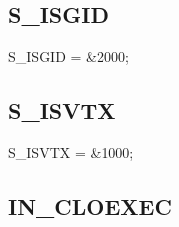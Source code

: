 \documentclass{report}
\newif\ifpdf
\begin{document}
\subsection*{S{\_}ISGID}
\fi
\label{ok_octal_notation-S_ISGID}
\begin{list}{}{
\setlength{\itemindent}{0cm}
\setlength{\listparindent}{0cm}
\setlength{\leftmargin}{\evensidemargin}
\addtolength{\leftmargin}{\tmplength}
\settowidth{\labelsep}{X}
\addtolength{\leftmargin}{\labelsep}
\setlength{\labelwidth}{\tmplength}
}
\item[\textbf{Declaration}\hfill]
\ifpdf
\begin{flushleft}
\fi
\begin{ttfamily}
S{\_}ISGID = {\&}2000;\end{ttfamily}

\ifpdf
\end{flushleft}
\fi

\end{list}
\ifpdf
\subsection*{\large{\textbf{S{\_}ISVTX}}\normalsize\hspace{1ex}\hrulefill}
\else
\subsection*{S{\_}ISVTX}
\fi
\label{ok_octal_notation-S_ISVTX}
\begin{list}{}{
\setlength{\itemindent}{0cm}
\setlength{\listparindent}{0cm}
\setlength{\leftmargin}{\evensidemargin}
\addtolength{\leftmargin}{\tmplength}
\settowidth{\labelsep}{X}
\addtolength{\leftmargin}{\labelsep}
\setlength{\labelwidth}{\tmplength}
}
\item[\textbf{Declaration}\hfill]
\ifpdf
\begin{flushleft}
\fi
\begin{ttfamily}
S{\_}ISVTX = {\&}1000;\end{ttfamily}

\ifpdf
\end{flushleft}
\fi

\end{list}
\ifpdf
\subsection*{\large{\textbf{IN{\_}CLOEXEC}}\normalsize\hspace{1ex}\hrulefill}
\else
\end{document}
